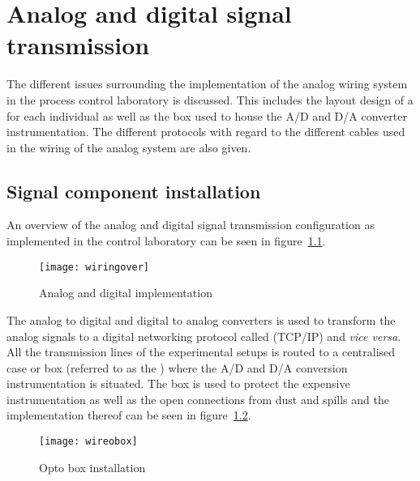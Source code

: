 \chapter{Analog and digital signal transmission}
\begin{overview}
The different issues surrounding the implementation of the analog wiring system in the process control laboratory is discussed. This includes the layout design of a  for each individual  as well as the box used to house the A/D and D/A converter instrumentation. The different protocols with regard to the different cables used in the wiring of the analog system are also given.
\end{overview}
  
\section{Signal component installation}
An overview of the analog and digital signal transmission configuration as implemented in the control laboratory can be seen in figure~\ref{fig:wire:over}. 
\begin{figure}[htbp]
	\centering
	\texttt{[image: wiringover]}
	\caption{Analog and digital implementation}
	\label{fig:wire:over}
\end{figure}

The analog to digital and digital to analog converters is used to transform the analog signals to a digital networking protocol called (TCP/IP) and \emph{vice versa}. All the transmission lines of the experimental setups is routed to a centralised case or box (referred to as the ) where the A/D and D/A conversion instrumentation is situated. The box is used to protect the expensive instrumentation as well as the open connections from dust and spills and the implementation thereof can be seen in figure~\ref{fig:wire:obox}.
\begin{figure}[htbp]
	\centering
	\texttt{[image: wireobox]}
	\caption{Opto box installation}
	\label{fig:wire:obox}
\end{figure}

